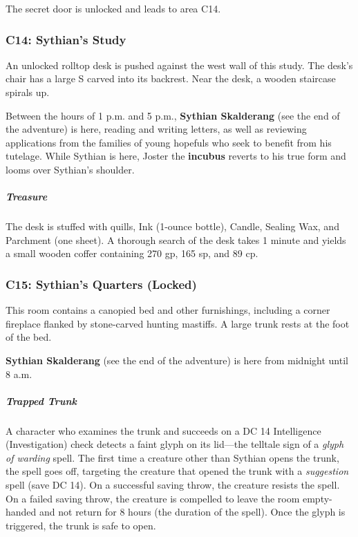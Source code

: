 \documentclass[10pt,a4paper,twoside,bg=print,twocolumn,openany,nodeprecatedcode]{dndbook}
\begin{document}
The secret door is unlocked and leads to area C14.

\subsubsection{C14: Sythian's Study}
\begin{DndReadAloud}{}
An unlocked rolltop desk is pushed against the west wall of this study. The desk's chair has a large S carved into its backrest. Near the desk, a wooden staircase spirals up.

\end{DndReadAloud}

Between the hours of 1 p.m. and 5 p.m., \textbf{Sythian Skalderang} (see the end of the adventure) is here, reading and writing letters, as well as reviewing applications from the families of young hopefuls who seek to benefit from his tutelage. While Sythian is here, Joster the \textbf{incubus} reverts to his true form and looms over Sythian's shoulder.

\subparagraph{Treasure}
The desk is stuffed with quills, Ink (1-ounce bottle), Candle, Sealing Wax, and Parchment (one sheet). A thorough search of the desk takes 1 minute and yields a small wooden coffer containing 270 gp, 165 sp, and 89 cp.

\subsubsection{C15: Sythian's Quarters (Locked)}
\begin{DndReadAloud}{}
This room contains a canopied bed and other furnishings, including a corner fireplace flanked by stone-carved hunting mastiffs. A large trunk rests at the foot of the bed.

\end{DndReadAloud}

\textbf{Sythian Skalderang} (see the end of the adventure) is here from midnight until 8 a.m.

\subparagraph{Trapped Trunk}
A character who examines the trunk and succeeds on a DC 14 Intelligence (Investigation) check detects a faint glyph on its lid—the telltale sign of a \textit{glyph of warding} spell. The first time a creature other than Sythian opens the trunk, the spell goes off, targeting the creature that opened the trunk with a \textit{suggestion} spell (save DC 14). On a successful saving throw, the creature resists the spell. On a failed saving throw, the creature is compelled to leave the room empty-handed and not return for 8 hours (the duration of the spell). Once the glyph is triggered, the trunk is safe to open.
\end{document}
